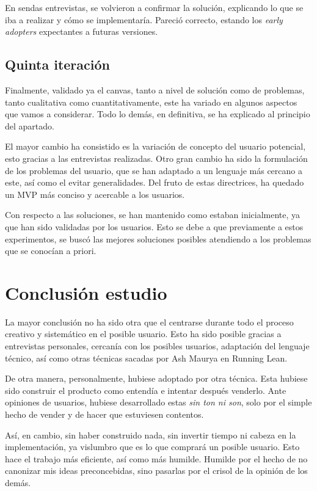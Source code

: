 En sendas entrevistas, se volvieron a confirmar la solución, explicando lo que se iba a realizar y cómo se implementaría. Pareció correcto, estando los \textit{early adopters} expectantes a futuras versiones.

\subsection{Quinta iteración}
Finalmente, validado ya el canvas, tanto a nivel de solución como de problemas, tanto cualitativa como cuantitativamente, este ha variado en algunos aspectos que vamos a considerar. Todo lo demás, en definitiva, se ha explicado al principio del apartado.

El mayor cambio ha consistido es la variación de concepto del usuario potencial, esto gracias a las entrevistas realizadas. Otro gran cambio ha sido la formulación de los problemas del usuario, que se han adaptado a un lenguaje más cercano a este, así como el evitar generalidades. Del fruto de estas directrices, ha quedado un MVP más conciso y acercable a los usuarios.

Con respecto a las soluciones, se han mantenido como estaban inicialmente, ya que han sido validadas por los usuarios. Esto se debe a que previamente a estos experimentos, se buscó las mejores soluciones posibles atendiendo a los problemas que se conocían a priori.


\section{Conclusión estudio}\label{sec:conclusiones_estudio}

La mayor conclusión no ha sido otra que el centrarse durante todo el proceso creativo y sistemático en el posible usuario. Esto ha sido posible gracias a entrevistas personales, cercanía con los posibles usuarios, adaptación del lenguaje técnico, así como otras técnicas sacadas por Ash Maurya en Running Lean.

De otra manera, personalmente, hubiese adoptado por otra técnica. Esta hubiese sido construir el producto como entendía e intentar después venderlo. Ante opiniones de usuarios, hubiese desarrollado estas \textit{sin ton ni son}, solo por el simple hecho de vender y de hacer que estuviesen contentos.

Así, en cambio, sin haber construido nada, sin invertir tiempo ni cabeza en la implementación, ya vislumbro que es lo que comprará un posible usuario. Esto hace el trabajo más eficiente, así como más humilde. Humilde por el hecho de no canonizar mis ideas preconcebidas, sino pasarlas por el crisol de la opinión de los demás.